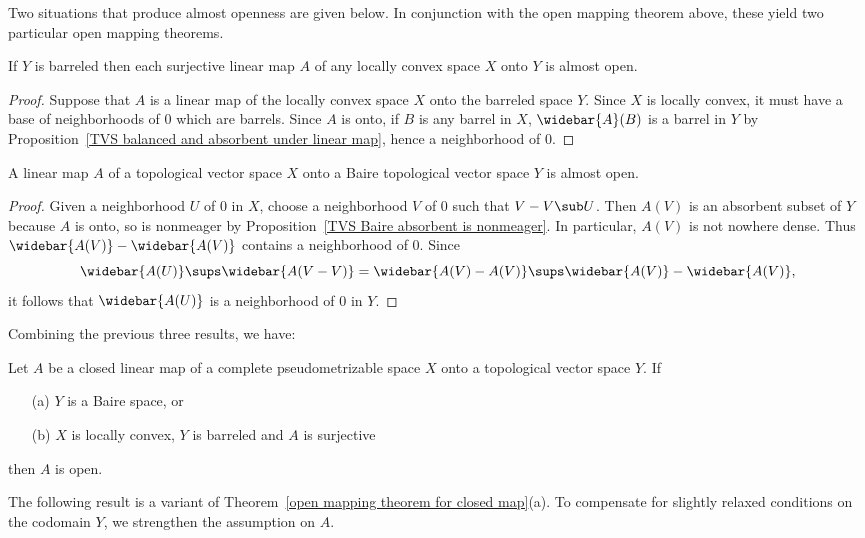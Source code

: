 Two situations that produce almost openness are given below. In conjunction with the open mapping theorem above, these yield two particular open mapping theorems.
\begin{proposition}\label{LCS barreled surjective is almost open}
If $Y$ is barreled then each surjective linear map $A$ of any locally convex space $X$ onto $Y$ is almost open.
\end{proposition}
\begin{proof}
Suppose that $A$ is a linear map of the locally convex space $X$ onto the barreled space $Y$. Since $X$ is locally convex, it must have a base of neighborhoods of $0$ which are barrels. Since $A$ is onto, if $B$ is any barrel in $X$, $\widebar{A}(B)$ is a barrel in $Y$ by Proposition~\ref{TVS balanced and absorbent under linear map}, hence a neighborhood of $0$.
\end{proof}
\begin{proposition}\label{TVS Baire surjective is almost open}
A linear map $A$ of a topological vector space $X$ onto a Baire topological vector space $Y$ is almost open.
\end{proposition}
\begin{proof}
Given a neighborhood $U$ of $0$ in $X$, choose a neighborhood $V$ of $0$ such that $V-V\sub U$. Then $A(V)$ is an absorbent subset of $Y$ because $A$ is onto, so is nonmeager by Proposition~\ref{TVS Baire absorbent is nonmeager}. In particular, $A(V)$ is not nowhere dense. Thus $\widebar{A(V)}-\widebar{A(V)}$ contains a neighborhood of $0$. Since
\[\widebar{A(U)}\sups\widebar{A(V-V)}=\widebar{A(V)-A(V)}\sups\widebar{A(V)}-\widebar{A(V)},\]
it follows that $\widebar{A(U)}$ is a neighborhood of $0$ in $Y$.
\end{proof}
Combining the previous three results, we have:
\begin{theorem}\label{open mapping theorem for closed map}
Let $A$ be a closed linear map of a complete pseudometrizable space $X$ onto a topological vector space $Y$. If
\begin{itemize}
\item[(a)] $Y$ is a Baire space, or
\item[(b)] $X$ is locally convex, $Y$ is barreled and $A$ is surjective
\end{itemize}
then $A$ is open.
\end{theorem}
The following result is a variant of Theorem~\ref{open mapping theorem for closed map}(a). To compensate for slightly relaxed conditions on the codomain $Y$, we strengthen the assumption on $A$.
